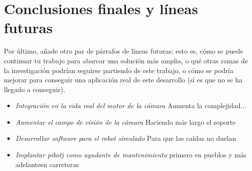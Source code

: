 \section{Conclusiones finales y líneas futuras}


Por último, añade otro par de párrafos de líneas futuras; esto es, cómo se puede continuar tu trabajo para abarcar una solución más amplia, o qué otras ramas de la investigación podrían seguirse partiendo de este trabajo, o cómo se podría mejorar para conseguir una aplicación real de este desarrollo (si es que no se ha llegado a conseguir).


\begin{itemize}
	\item \textit{Integración en la vida real del motor de la cámara} Aumenta la complejidad...
	\item \textit{Aumentar el campo de visión de la cámara} Haciendo más largo el soporte
	\item \textit{Desarrollar software para el robot simulado} Para que las caídas no duelan
	\item \textit{Implantar pibotj como ayudante de mantenimiento} primero en pueblos y más adelanteen carreteras
\end{itemize}\

